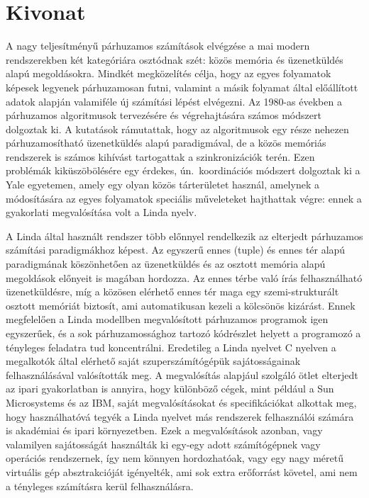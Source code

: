 \setcounter{page}{1}

\selecthungarian

\chapter*{Kivonat}

A nagy teljesítményű párhuzamos számítások elvégzése a mai modern rendszerekben két kategóriára osztódnak szét: közös memória és üzenetküldés alapú megoldásokra. Mindkét megközelítés célja, hogy az egyes folyamatok képesek legyenek párhuzamosan futni, valamint a másik folyamat által előállított adatok alapján valamiféle új számítási lépést elvégezni. Az 1980-as években a párhuzamos algoritmusok tervezésére és végrehajtására számos módszert dolgoztak ki. A kutatások rámutattak, hogy az algoritmusok egy része nehezen párhuzamosítható üzenetküldés alapú paradigmával, de a közös memóriás rendszerek is számos kihívást tartogattak a szinkronizációk terén. Ezen problémák kiküszöbölésére egy érdekes, ún.\ koordinációs módszert dolgoztak ki a Yale egyetemen, amely egy olyan közös tárterületet használ, amelynek a módosítására az egyes folyamatok speciális műveleteket hajthattak végre: ennek a gyakorlati megvalósítása volt a Linda nyelv.

A Linda által használt rendszer több előnnyel rendelkezik az elterjedt párhuzamos számítási paradigmákhoz képest. Az egyszerű ennes (tuple) és ennes tér alapú paradigmának köszönhetően az üzenetküldés és az osztott memória alapú megoldások előnyeit is magában hordozza. Az ennes térbe való írás felhasználható üzenetküldésre, míg a közösen elérhető ennes tér maga egy szemi-strukturált osztott memóriát biztosít, ami automatikusan kezeli a kölcsönös kizárást. Ennek megfelelően a Linda modellben megvalósított párhuzamos programok igen egyszerűek, és a sok párhuzamossághoz tartozó kódrészlet helyett a programozó a tényleges feladatra tud koncentrálni. Eredetileg a Linda nyelvet C nyelven a megalkotók által elérhető saját szuperszámítógépük sajátosságainak felhasználásával valósították meg. A megvalósítás alapjául szolgáló ötlet elterjedt az ipari gyakorlatban is annyira, hogy különböző cégek, mint például a Sun Microsystems és az IBM, saját megvalósításokat és specifikációkat alkottak meg, hogy használhatóvá tegyék a Linda nyelvet más rendszerek felhasználói számára is akadémiai és ipari környezetben. Ezek a megvalósítások azonban, vagy valamilyen sajátosságát használták ki egy-egy adott számítógépnek vagy operációs rendszernek, így nem könnyen hordozhatóak, vagy egy nagy méretű virtuális gép absztrakcióját igényelték, ami sok extra erőforrást követel, ami nem a tényleges számításra kerül felhasználásra.

